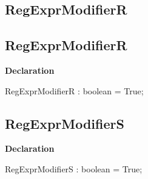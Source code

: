 \documentclass{report}
\newif\ifpdf
\begin{document}
\subsection*{\large{\textbf{RegExprModifierR}}\normalsize\hspace{1ex}\hrulefill}
\else
\subsection*{RegExprModifierR}
\fi
\label{RegExpr-RegExprModifierR}
\begin{list}{}{
\setlength{\itemindent}{0cm}
\setlength{\listparindent}{0cm}
\setlength{\leftmargin}{\evensidemargin}
\addtolength{\leftmargin}{\tmplength}
\settowidth{\labelsep}{X}
\addtolength{\leftmargin}{\labelsep}
\setlength{\labelwidth}{\tmplength}
}
\item[\textbf{Declaration}\hfill]
\ifpdf
\begin{flushleft}
\fi
\begin{ttfamily}
RegExprModifierR : boolean = True;\end{ttfamily}

\ifpdf
\end{flushleft}
\fi

\end{list}
\ifpdf
\subsection*{\large{\textbf{RegExprModifierS}}\normalsize\hspace{1ex}\hrulefill}
\else
\subsection*{RegExprModifierS}
\fi
\label{RegExpr-RegExprModifierS}
\begin{list}{}{
\setlength{\itemindent}{0cm}
\setlength{\listparindent}{0cm}
\setlength{\leftmargin}{\evensidemargin}
\addtolength{\leftmargin}{\tmplength}
\settowidth{\labelsep}{X}
\addtolength{\leftmargin}{\labelsep}
\setlength{\labelwidth}{\tmplength}
}
\item[\textbf{Declaration}\hfill]
\ifpdf
\begin{flushleft}
\fi
\begin{ttfamily}
RegExprModifierS : boolean = True;\end{ttfamily}

\ifpdf
\end{flushleft}
\fi

\end{list}
\ifpdf
\end{document}
